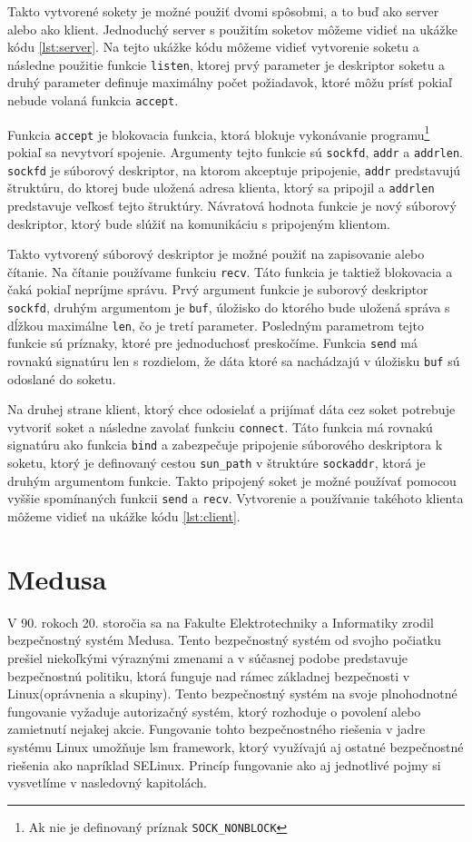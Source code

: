 Takto vytvorené sokety je možné použiť dvomi spôsobmi, a to buď ako server alebo ako klient. 
Jednoduchý server s použitím soketov môžeme vidieť na ukážke kódu \ref{lst:server}. Na tejto ukážke kódu môžeme vidieť vytvorenie soketu a následne použitie funkcie \texttt{listen}, ktorej prvý parameter je deskriptor soketu a druhý parameter definuje maximálny počet požiadavok, ktoré môžu prísť pokiaľ nebude volaná funkcia \texttt{accept}. 

Funkcia \texttt{accept} je blokovacia funkcia, ktorá blokuje vykonávanie programu\footnote{Ak nie je definovaný príznak \texttt{SOCK\_NONBLOCK}} pokiaľ sa nevytvorí spojenie. Argumenty tejto funkcie sú \texttt{sockfd}, \texttt{addr} a \texttt{addrlen}. \texttt{sockfd} je súborový deskriptor, na ktorom akceptuje pripojenie, \texttt{addr} predstavujú štruktúru, do ktorej bude uložená adresa klienta, ktorý sa pripojil a \texttt{addrlen} predstavuje veľkosť tejto štruktúry. Návratová hodnota funkcie je nový súborový deskriptor, ktorý bude slúžiť na komunikáciu s pripojeným klientom. 

Takto vytvorený súborový deskriptor je možné použiť na zapisovanie alebo čítanie. Na čítanie používame funkciu \texttt{recv}. Táto funkcia je taktiež blokovacia a čaká pokiaľ nepríjme správu. Prvý argument funkcie je suborový deskriptor \texttt{sockfd}, druhým argumentom je \texttt{buf}, úložisko do ktorého bude uložená správa s dĺžkou maximálne \texttt{len}, čo je tretí parameter. Posledným parametrom tejto funkcie sú príznaky, ktoré pre jednoduchosť preskočíme. Funkcia \texttt{send} má rovnakú signatúru len s rozdielom, že dáta ktoré sa nachádzajú v úložisku \texttt{buf} sú odoslané do soketu.

Na druhej strane klient, ktorý chce odosielať a prijímať dáta cez soket potrebuje vytvoriť soket a následne zavolať funkciu \texttt{connect}. Táto funkcia má rovnakú signatúru ako funkcia \texttt{bind} a zabezpečuje pripojenie súborového deskriptora k soketu, ktorý je definovaný cestou \texttt{sun\_path} v štruktúre \texttt{sockaddr}, ktorá je druhým argumentom funkcie. Takto pripojený soket je možné používať pomocou vyššie spomínaných funkcii \texttt{send} a \texttt{recv}. Vytvorenie a používanie takéhoto klienta môžeme vidieť na ukážke kódu \ref{lst:client}.\cite{beej}

\section{Medusa} \label{medusa}
V 90. rokoch 20. storočia sa na Fakulte Elektrotechniky a Informatiky zrodil bezpečnostný systém Medusa. Tento bezpečnostný systém od svojho počiatku prešiel niekoľkými výraznými zmenami a v súčasnej podobe predstavuje bezpečnostnú politiku, ktorá funguje nad rámec základnej bezpečnosti v Linux(oprávnenia a skupiny). Tento bezpečnostný systém na svoje plnohodnotné fungovanie vyžaduje autorizačný systém, ktorý rozhoduje o povolení alebo zamietnutí nejakej akcie. Fungovanie tohto bezpečnostného riešenia v jadre systému Linux umožňuje \acrshort{lsm} framework, ktorý využívajú aj ostatné bezpečnostné riešenia ako napríklad \acrshort{SELinux}. Princíp fungovanie ako aj jednotlivé pojmy si vysvetlíme v nasledovný kapitolách.

